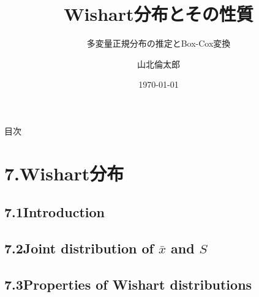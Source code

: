 \documentclass[aspectratio=169]{beamer}
\title{Wishart分布とその性質}
\subtitle{多変量正規分布の推定とBox-Cox変換}
\author{山北倫太郎}
\date{\today}
\begin{document}

\begin{frame}
\titlepage
\end{frame}

\begin{frame}{目次}
\tableofcontents
\end{frame}

\section{7.Wishart分布}
\subsection{7.1Introduction}
\subsection{7.2Joint distribution of $\bar{x}$ and $S$}
\subsection{7.3Properties of Wishart distributions}
\end{document}
